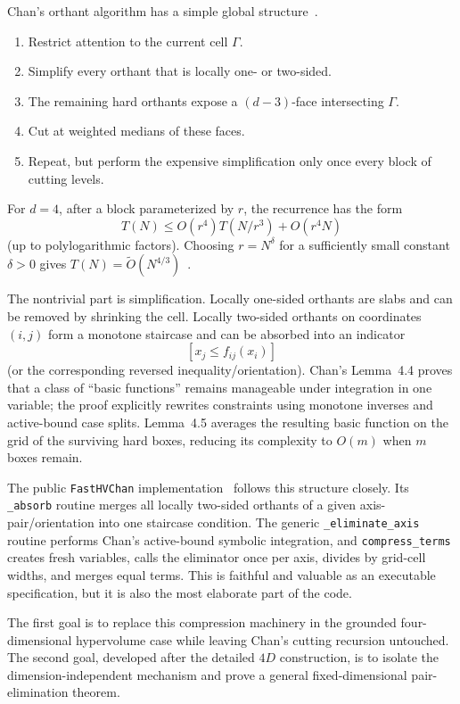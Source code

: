 \documentclass[12pt,a4paper]{article}
\theoremstyle{definition}
\newcommand{\1}{\mathbf 1}
\newcommand{\wtO}{\widetilde O}
\begin{document}
Chan's orthant algorithm has a simple global structure~\cite{Chan2013}.

\begin{enumerate}
\item Restrict attention to the current cell $\Gamma$.
\item Simplify every orthant that is locally one- or two-sided.
\item The remaining hard orthants expose a $(d-3)$-face intersecting $\Gamma$.
\item Cut at weighted medians of these faces.
\item Repeat, but perform the expensive simplification only once every block of cutting levels.
\end{enumerate}

For $d=4$, after a block parameterized by $r$, the recurrence has the form
\begin{equation}
T(N)\le O(r^4)T(N/r^3)+O(r^4N)                         \label{eq:chanrec}
\end{equation}
(up to polylogarithmic factors). Choosing $r=N^\delta$ for a sufficiently small constant $\delta>0$ gives $T(N)=\wtO(N^{4/3})$~\cite{Chan2013}.

The nontrivial part is simplification. Locally one-sided orthants are slabs and can be removed by shrinking the cell. Locally two-sided orthants on coordinates $(i,j)$ form a monotone staircase and can be absorbed into an indicator
\[
[x_j\le f_{ij}(x_i)]
\]
(or the corresponding reversed inequality/orientation). Chan's Lemma~4.4 proves that a class of ``basic functions'' remains manageable under integration in one variable; the proof explicitly rewrites constraints using monotone inverses and active-bound case splits. Lemma~4.5 averages the resulting basic function on the grid of the surviving hard boxes, reducing its complexity to $O(m)$ when $m$ boxes remain.

The public \texttt{FastHVChan} implementation~\cite{FastHVChan} follows this structure closely. Its \texttt{\_absorb} routine merges all locally two-sided orthants of a given axis-pair/orientation into one staircase condition. The generic \texttt{\_eliminate\_axis} routine performs Chan's active-bound symbolic integration, and \texttt{compress\_terms} creates fresh variables, calls the eliminator once per axis, divides by grid-cell widths, and merges equal terms. This is faithful and valuable as an executable specification, but it is also the most elaborate part of the code.

The first goal is to replace this compression machinery in the grounded four-dimensional hypervolume case while leaving Chan's cutting recursion untouched.  The second goal, developed after the detailed $4D$ construction, is to isolate the dimension-independent mechanism and prove a general fixed-dimensional pair-elimination theorem.
\end{document}
